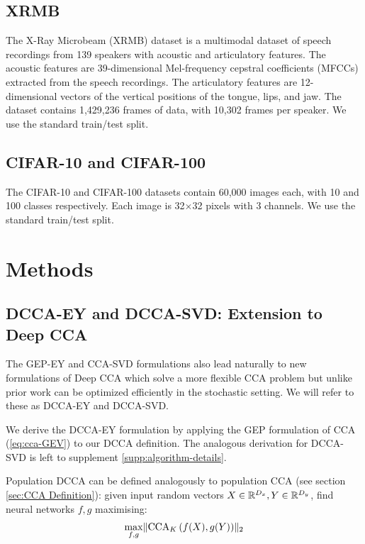 \subsection{XRMB}
The X-Ray Microbeam (XRMB) dataset \cite{westbury1994x} is a multimodal dataset of speech recordings from 139 speakers with acoustic and articulatory features. The acoustic features are 39-dimensional Mel-frequency cepstral coefficients (MFCCs) extracted from the speech recordings. The articulatory features are 12-dimensional vectors of the vertical positions of the tongue, lips, and jaw. The dataset contains 1,429,236 frames of data, with 10,302 frames per speaker. We use the standard train/test split.

\subsection{CIFAR-10 and CIFAR-100}
The CIFAR-10 and CIFAR-100 datasets contain 60,000 images each, with 10 and 100 classes respectively. Each image is 32$\times$32 pixels with 3 channels. We use the standard train/test split.


\section{Methods}

\subsection{DCCA-EY and DCCA-SVD: Extension to Deep CCA}\label{sec:deep-cca}
The GEP-EY and CCA-SVD formulations also lead naturally to new formulations of Deep CCA which solve a more flexible CCA problem but unlike prior work can be optimized efficiently in the stochastic setting. We will refer to these as DCCA-EY and DCCA-SVD.

We derive the DCCA-EY formulation by applying the GEP formulation of CCA (\ref{eq:cca-GEV}) to our DCCA definition. The analogous derivation for DCCA-SVD is left to supplement \ref{supp:algorithm-details}. 

Population DCCA \cite{andrew2013deep} can be defined analogously to population CCA (see section \ref{sec:CCA Definition}):
given input random vectors $X \in \mathbb{R}^{D_x}, Y \in \mathbb{R}^{D_y}$, find neural networks $f,g$ maximising:
\begin{align}\label{eq:DCCA-Andrew}
    \max_{f,g}  \lVert\operatorname{CCA}_K\left(f(X),g(Y)\right)\rVert_2
\end{align}

